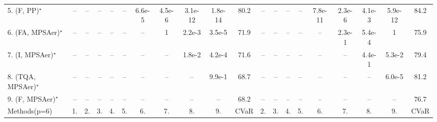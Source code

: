 \begin{table}[ht]
{\begin{tabular}{l|cccccccccc|ccccccccc|}
5. (F, PP)$^\star$ & -- & -- & -- & -- & -- & {\cellcolor[HTML]{00441B}} \color[HTML]{F1F1F1} 6.6e-5 & {\cellcolor[HTML]{00441B}} \color[HTML]{F1F1F1} 4.5e-6 & {\cellcolor[HTML]{00441B}} \color[HTML]{F1F1F1} 3.1e-12 & {\cellcolor[HTML]{00441B}} \color[HTML]{F1F1F1} 1.8e-14 & 80.2 & -- & -- & -- & -- & {\cellcolor[HTML]{00441B}} \color[HTML]{F1F1F1} 7.8e-11 & {\cellcolor[HTML]{00441B}} \color[HTML]{F1F1F1} 2.3e-6 & {\cellcolor[HTML]{309950}} \color[HTML]{F1F1F1} 4.1e-3 & {\cellcolor[HTML]{00441B}} \color[HTML]{F1F1F1} 5.9e-12 & 84.2 \\
6. (FA, MPSAer)$^\star$ & -- & -- & -- & -- & -- & -- & 1 & {\cellcolor[HTML]{309950}} \color[HTML]{F1F1F1} 2.2e-3 & {\cellcolor[HTML]{00441B}} \color[HTML]{F1F1F1} 3.5e-5 & 71.9 & -- & -- & -- & -- & -- & 2.3e-1 & {\cellcolor[HTML]{00441B}} \color[HTML]{F1F1F1} 5.4e-4 & 1 & 75.9 \\
7. (I, MPSAer)$^\star$ & -- & -- & -- & -- & -- & -- & -- & {\cellcolor[HTML]{B5E1AE}} \color[HTML]{000000} 1.8e-2 & {\cellcolor[HTML]{00441B}} \color[HTML]{F1F1F1} 4.2e-4 & 71.6 & -- & -- & -- & -- & -- & -- & 4.4e-1 & 5.3e-2 & 79.4 \\
8. (TQA, MPSAer)$^\star$ & -- & -- & -- & -- & -- & -- & -- & -- & 9.9e-1 & 68.7 & -- & -- & -- & -- & -- & -- & -- & {\cellcolor[HTML]{00441B}} \color[HTML]{F1F1F1} 6.0e-5 & 81.2 \\
9. (F, MPSAer)$^\star$ & -- & -- & -- & -- & -- & -- & -- & -- & -- & 68.2 & -- & -- & -- & -- & -- & -- & -- & -- & 76.7 \\
\hline

Methods(p=6) & 1. & 2. & 3. & 4. & 5. & 6. & 7. & 8. & 9. & CVaR & 2. & 3. & 4. & 5. & 6. & 7. & 8. & 9. & CVaR \\
\hline


\end{tabular}}
\end{table}

